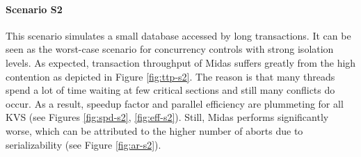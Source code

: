 \paragraph{Scenario S2}

This scenario simulates a small database accessed by long transactions. It can be seen as the worst-case scenario for concurrency controls with strong isolation levels. As expected, transaction throughput of Midas suffers greatly from the high contention as depicted in Figure \ref{fig:ttp-s2}. The reason is that many threads spend a lot of time waiting at few critical sections and still many conflicts do occur. As a result, speedup factor and parallel efficiency are plummeting for all KVS (see Figures \ref{fig:spd-s2}, \ref{fig:eff-s2}). Still, Midas performs significantly worse, which can be attributed to the higher number of aborts due to serializability (see Figure \ref{fig:ar-s2}).

